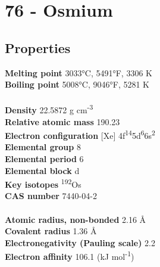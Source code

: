 \section{76 - Osmium}
\label{sec:elem-osmium}
\subsection{Properties}
\textbf{Melting point} 3033°C, 5491°F, 3306 K\\
\textbf{Boiling point} 5008°C, 9046°F, 5281 K\\
\\
\textbf{Density} 22.5872 g cm\textsuperscript{-3}\\
\textbf{Relative atomic mass} 190.23\\
\textbf{Electron configuration} [Xe] 4f\textsuperscript{14}5d\textsuperscript{6}6s\textsuperscript{2}\\
\textbf{Elemental group} 8\\
\textbf{Elemental period} 6\\
\textbf{Elemental block} d\\
\textbf{Key isotopes} \textsuperscript{192}Os\\
\textbf{CAS number} 7440-04-2\\
\\
\textbf{Atomic radius, non-bonded} 2.16 Å\\
\textbf{Covalent radius} 1.36 Å\\
\textbf{Electronegativity (Pauling scale)} 2.2\\
\textbf{Electron affinity} 106.1 (kJ mol\textsuperscript{-1})\\